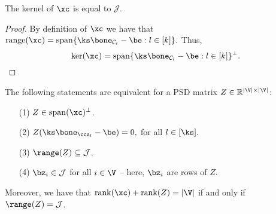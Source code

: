 \begin{proposition}\label{kernellemma}
The kernel  of $\xc$ is equal to  $ \mathcal{J}.$ 
\end{proposition}

\begin{proof} By definition of $\xc$ we have that 
${\rm range}(\xc)={\rm span}\{ \ks \bone_{\mathcal{C}_l}-\be: l \in [k]\}.$
Thus,
$${\rm ker}(\xc) ={\rm span}\{ \ks \bone_{\mathcal{C}_l}-\be: l \in [k]\}^\perp.$$

\end{proof} 



\begin{proposition}\label{csexpnaded}
The following  statements are equivalent for a PSD matrix $Z \in \mathbb{R}^{|\V| \times |\V|}$:

\begin{itemize}
\item[(1)]  $  Z\in  {\rm span}( \xc)^\perp$.%
\item[(2)] $Z(\ks\bone_{\ccs_l} -\be)=0,$ for all $ l \in [\ks].$

\item[(3)] $\range(Z) \subseteq \mathcal{J}$.

\item[(4)] $\bz_i \in \mathcal{J}$ for all $i \in \V$ -- here, $\bz_i$ are rows of $Z$.
\end{itemize} 
Moreover, we have that ${\rm rank}(\xc)+{\rm rank}(Z)=|\V|$ if and only if   $\range(Z) = \mathcal{J}$.

\end{proposition}



